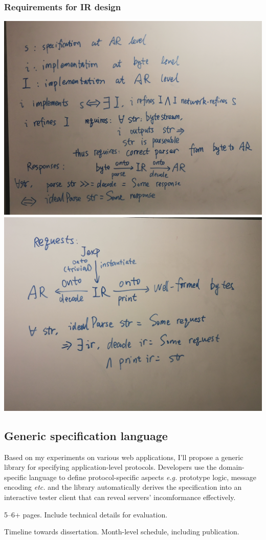 \documentclass{article}
\theoremstyle{definition}
\begin{document}
\subsubsection{Requirements for IR design}
\includegraphics[width=\textwidth]{figures/ir-parse}
\includegraphics[width=\textwidth]{figures/ir-print}
\subsection{Generic specification language}
Based on my experiments on various web applications, I'll propose a generic
library for specifying application-level protocols.  Developers use the
domain-specific language to define protocol-specific aspects {\it e.g.}
prototype logic, message encoding {\it etc.}  and the library automatically
derives the specification into an interactive tester client that can reveal
servers' incomformance effectively.

5--6+ pages.  Include technical details for evaluation.

Timeline towards dissertation.  Month-level schedule, including publication.

\printbibliography
\end{document}
